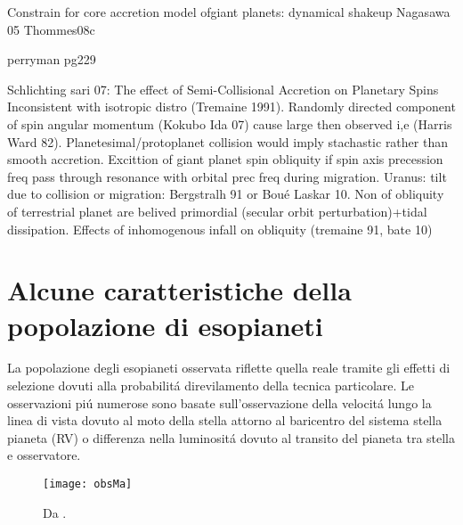 \begin{workout}
Constrain for core accretion model ofgiant planets: dynamical shakeup Nagasawa 05 Thommes08c
\end{workout}

\begin{workout}
perryman pg229
\end{workout}


\begin{workout}

\end{workout}

\begin{workout}
Schlichting sari 07: The effect of Semi-Collisional Accretion on Planetary Spins
Inconsistent with isotropic distro (Tremaine 1991). Randomly directed component of spin angular momentum (Kokubo Ida 07) cause large then observed i,e (Harris Ward 82).
Planetesimal/protoplanet collision would imply stachastic rather than smooth accretion.
Excittion of giant planet spin obliquity if spin axis precession freq pass through resonance with orbital prec freq during migration.
Uranus: tilt due to collision or migration: Bergstralh 91 or Bou\'e Laskar 10.
Non of obliquity of terrestrial planet are belived primordial (secular orbit perturbation)+tidal dissipation.
Effects of inhomogenous infall on obliquity (tremaine 91, bate 10)
\end{workout}

{\let\clearpage\relax\let\cleardoublepage\relax
\chapter{Alcune caratteristiche della popolazione di esopianeti}
}

La popolazione degli esopianeti osservata riflette quella reale tramite gli effetti di selezione dovuti alla probabilit\'a direvilamento della tecnica particolare. Le osservazioni pi\'u numerose sono basate sull'osservazione della velocit\'a lungo la linea di vista dovuto al moto della stella attorno al baricentro del sistema stella pianeta (RV) o differenza nella luminosit\'a dovuto al transito del pianeta tra stella e osservatore.

\begin{figure}[!ht]
\texttt{[image: obsMa]}\label{fig:Maplot}
\caption{Da \cite{mordasini2018}.}
\end{figure}

